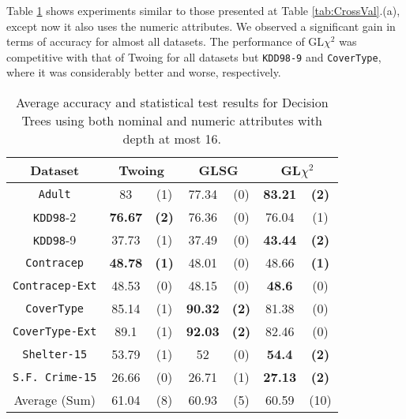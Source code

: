 Table \ref{exp:secondsetnumeric}
shows experiments  similar to those presented at Table \ref{tab:CrossVal}.(a), except now it also uses the numeric attributes.
We observed a significant gain in terms of accuracy for almost all datasets. 
The performance of GL$\chi^2$ was competitive with that of Twoing for all datasets but {\tt KDD98-9} and {\tt CoverType}, where it was
considerably better and worse, respectively.


\begin{table}
\small
\caption{Average accuracy and statistical test results for  Decision Trees using both nominal and numeric attributes with depth at most 16.}
\centering
\begin{tabular}{c|cc|cc|cc} 
Dataset              &        \multicolumn{2}{c|}{Twoing} &   \multicolumn{2}{c|}{GLSG} &   \multicolumn{2}{c}{GL$\chi^2$} \\  \hline   
{\tt Adult}          &  83            &  (1)              &  77.34      &  (0)          &  {\bf 83.21} &  {\bf (2)}        \\
{\tt KDD98}-2        &  {\bf 76.67}   &  {\bf (2)}        &  76.36      &  (0)          &  76.04       &  (1)              \\
{\tt KDD98}-9        &  37.73         &  (1)              &  37.49      &  (0)          &  {\bf 43.44} &  {\bf (2)}        \\
{\tt Contracep}      &  {\bf 48.78}   &  {\bf (1)}        &  48.01      &  (0)          &  48.66       &  {\bf (1)}        \\
{\tt Contracep-Ext}  &  48.53         &  (0)              &  48.15      &  (0)          &  {\bf 48.6}  &  (0)              \\
{\tt CoverType}      &  85.14         &  (1)              &  {\bf 90.32}&  {\bf (2)}    &  81.38       &  (0)              \\
{\tt CoverType-Ext}  &  89.1          &  (1)              &  {\bf 92.03}&  {\bf (2)}    &  82.46       &  (0)              \\
{\tt Shelter-15}     &  53.79         &  (1)              &  52         &  (0)          &  {\bf 54.4}  &  {\bf (2)}        \\   
{\tt S.F. Crime-15}  &  26.66         &  (0)              &  26.71      &  (1)          &  {\bf 27.13} &  {\bf (2)}        \\
\hline
Average (Sum)        &   61.04        &  (8)              & 60.93       & (5)           &   60.59     & (10)

\end{tabular}
\label{exp:secondsetnumeric}
\normalsize
\end{table}

